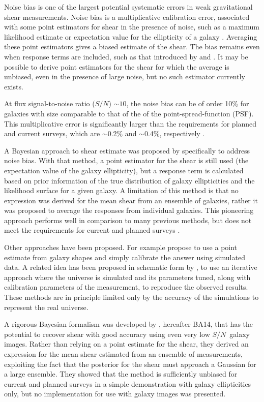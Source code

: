 \documentclass[usegraphicx,usenatbib]{mn2e}
\newcommand{\sn}{$S/N$}
\begin{document}
Noise bias is one of the largest potential systematic errors in weak
gravitational shear measurements.  Noise bias is a multiplicative calibration
error, associated with some point estimators for shear in the presence of
noise, such as a maximum likelihood estimate or expectation value for the
ellipticity of a galaxy \citep{HirataAlign04,Refreg12,Melchior12,Miller13}.
Averaging these point estimators gives a biased estimate of the shear.  The
bias remains even when response terms are included, such as that introduced by
\cite{ksb95} and \cite{Bern02}. It may be possible to derive point estimators
for the shear for which the average is unbiased, even in the presence of large
noise, but no such estimator currently exists.

At flux signal-to-noise ratio (\sn) $\sim 10$, the noise bias can be of order
10\% for galaxies with size comparable to that of the of the
point-spread-function (PSF).  This multiplicative error is significantly larger
than the requirements for planned and current surveys, which are $\sim$0.2\%
and $\sim$0.4\%, respectively \citep{HutererSystematics06}.

A Bayesian approach to shear estimate was proposed by \cite{Miller07}
specifically to address noise bias.  With that method, a point estimator for
the shear is still used (the expectation value of the galaxy ellipticity), but
a response term is calculated based on prior information of the true
distribution of galaxy ellipticities and the likelihood surface for a given
galaxy.  A limitation of this method is that no expression was derived for the
mean shear from an ensemble of galaxies, rather it was proposed to average the
responses from individual galaxies.  This pioneering approach performs well in
comparison to many previous methods, but does not meet the requirements for
current and planned surveys \citep{ba14}.

Other approaches have been proposed. For example \cite{Zuntz13} propose to use
a point estimate from galaxy shapes and simply calibrate the answer using
simulated data.  A related idea has been proposed in schematic form by
\cite{Refregier13}, to use an iterative approach where the universe is
simulated and its parameters tuned, along with calibration parameters of the
measurement, to reproduce the observed results.  These methods are in principle
limited only by the accuracy of the simulations to represent the real universe.

A rigorous Bayesian formalism was developed by \cite{ba14}, hereafter BA14,
that has the potential to recover shear with good accuracy using even very low
\sn\ galaxy images.  Rather than relying on a point estimate for the shear,
they derived an expression for the mean shear estimated from an ensemble of
measurements, exploiting the fact that the posterior for the shear must
approach a Gaussian for a large ensemble.  They showed that the method is
sufficiently unbiased for current and planned surveys in a simple demonstration
with galaxy ellipticities only, but no implementation for use with galaxy
images was presented.
\end{document}
